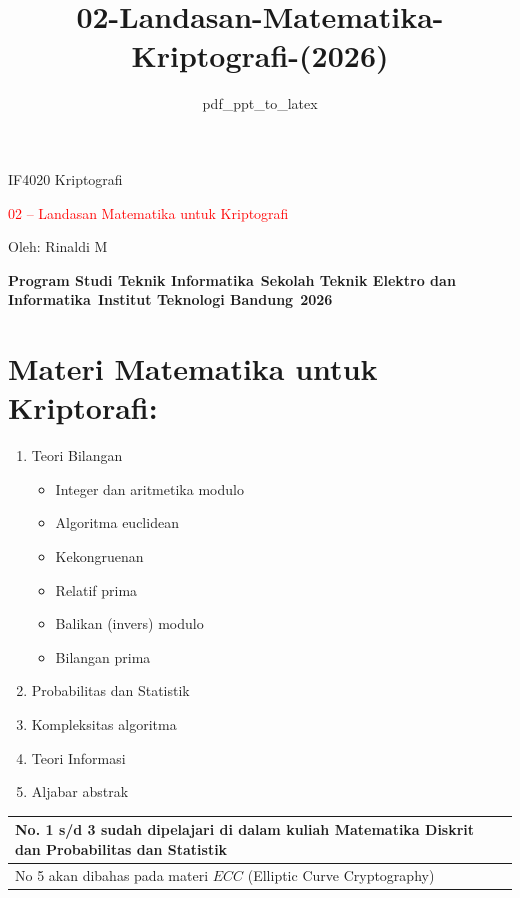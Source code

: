 \documentclass{article}
\title{02-Landasan-Matematika-Kriptografi-(2026)}
\author{pdf\_ppt\_to\_latex}
\date{}
\begin{document}

\begin{center}
{\large IF4020 Kriptografi}

\vspace{20mm}
{\huge \textcolor{red}{02 -- Landasan Matematika untuk Kriptografi}}

\vspace{15mm}
Oleh: Rinaldi M

\vspace{10mm}
\textbf{Program Studi Teknik Informatika}\
\textbf{Sekolah Teknik Elektro dan Informatika}\
\textbf{Institut Teknologi Bandung}\
\textbf{2026}
\end{center}

\newpage


\section*{Materi Matematika untuk Kriptorafi:}

\begin{enumerate}
    \item Teori Bilangan
    \begin{itemize}
        \item Integer dan aritmetika modulo
        \item Algoritma euclidean
        \item Kekongruenan
        \item Relatif prima
        \item Balikan (invers) modulo
        \item Bilangan prima
    \end{itemize}
    \item Probabilitas dan Statistik
    \item Kompleksitas algoritma
    \item Teori Informasi
    \item Aljabar abstrak
\end{enumerate}

\vspace{10mm}

\begin{tabular}{|p{9cm}|}
\hline
No. 1 s/d 3 sudah dipelajari di dalam kuliah Matematika Diskrit dan Probabilitas dan Statistik \\
\hline
No 5 akan dibahas pada materi $ECC$ (Elliptic Curve Cryptography) \\
\hline
\end{tabular}
\end{document}
